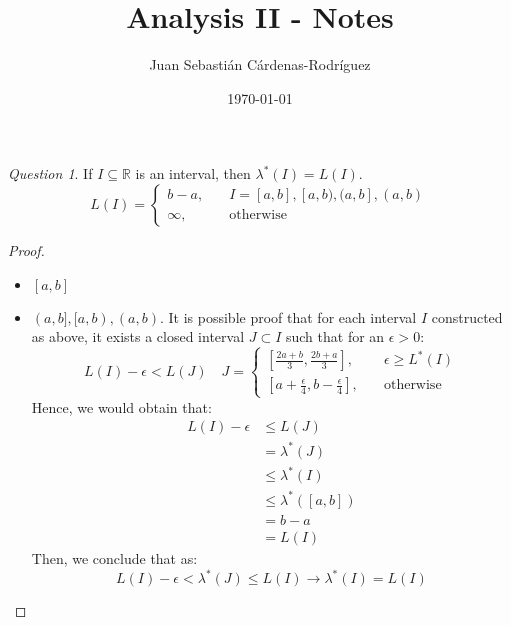 \documentclass[11pt]{article}
\title{Analysis II - Notes}
\author{Juan Sebasti\'an C\'ardenas-Rodríguez \\
  \scalebox{0.7}{Mathematical Engineering, Universidad EAFIT}}
\date{\today}
\theoremstyle{definition}
\theoremstyle{remark}
\theoremstyle{remark}
\newtheorem{question}{Question}
\newcommand{\R}{{\mathbb{R}}}
\begin{document}
\maketitle
\begin{question}
  If $I \subseteq \R$ is an interval, then $\lambda^*(I) = L(I)$.
  \begin{equation*}
    L(I) =
    \begin{cases}
      b - a, &\quad I=[a,b], [a, b), (a, b], (a, b) \\
      \infty, &\quad \text{otherwise}
    \end{cases}
  \end{equation*}
\end{question}
\begin{proof}
  \begin{itemize}
  \item $[a,b]$
  \item $(a, b], [a, b), (a, b)$.  It is possible proof that for each
    interval $I$ constructed as above, it exists a closed interval
    $J \subset I$ such that for an $\epsilon > 0$:
    \begin{equation*}
      L(I) - \epsilon< L(J) \quad
      J =
      \begin{cases}
        \left[\frac{2a + b}{3}, \frac{2b + a}{3}\right], &\quad \epsilon \ge L^*(I) \\
        \left[a + \frac{\epsilon}{4}, b - \frac{\epsilon}{4}\right], &\quad\text{otherwise}
      \end{cases}
    \end{equation*}
    Hence, we would obtain that:
    \begin{align*}
      L(I) - \epsilon &\le L(J) \\
                      &= \lambda^*(J) \\
                      &\le \lambda^*(I) \\
                      &\le \lambda^*([a, b]) \\
                      &= b - a \\
                      &= L(I)
    \end{align*}
    Then, we conclude that as:
    \begin{equation*}
      L(I) - \epsilon < \lambda^*(J) \le L(I) \rightarrow \lambda^*(I) = L(I)
    \end{equation*}
  \end{itemize}
\end{proof}
\end{document}
